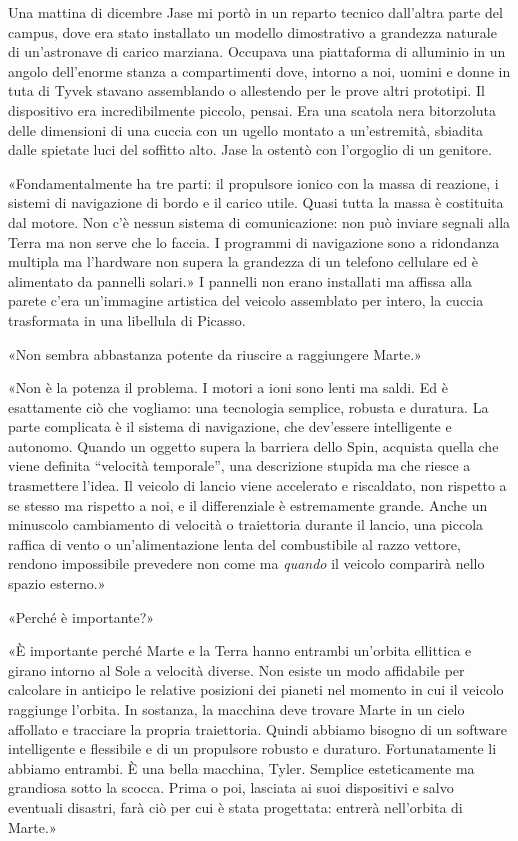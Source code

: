 Una mattina di dicembre Jase mi portò in un reparto tecnico dall'altra
parte del campus, dove era stato installato un modello dimostrativo a
grandezza naturale di un'astronave di carico marziana. Occupava una
piattaforma di alluminio in un angolo dell'enorme stanza a compartimenti
dove, intorno a noi, uomini e donne in tuta di Tyvek stavano assemblando
o allestendo per le prove altri prototipi. Il dispositivo era
incredibilmente piccolo, pensai. Era una scatola nera bitorzoluta delle
dimensioni di una cuccia con un ugello montato a un'estremità, sbiadita
dalle spietate luci del soffitto alto. Jase la ostentò con l'orgoglio di
un genitore.

«Fondamentalmente ha tre parti: il propulsore ionico con la massa di
reazione, i sistemi di navigazione di bordo e il carico utile. Quasi
tutta la massa è costituita dal motore. Non c'è nessun sistema di
comunicazione: non può inviare segnali alla Terra ma non serve che lo
faccia. I programmi di navigazione sono a ridondanza multipla ma
l'hardware non supera la grandezza di un telefono cellulare ed è
alimentato da pannelli solari.» I pannelli non erano installati ma
affissa alla parete c'era un'immagine artistica del veicolo assemblato
per intero, la cuccia trasformata in una libellula di Picasso.

«Non sembra abbastanza potente da riuscire a raggiungere Marte.»

«Non è la potenza il problema. I motori a ioni sono lenti ma saldi. Ed è
esattamente ciò che vogliamo: una tecnologia semplice, robusta e
duratura. La parte complicata è il sistema di navigazione, che
dev'essere intelligente e autonomo. Quando un oggetto supera la barriera
dello Spin, acquista quella che viene definita ``velocità temporale'',
una descrizione stupida ma che riesce a trasmettere l'idea. Il veicolo
di lancio viene accelerato e riscaldato, non rispetto a se stesso ma
rispetto a noi, e il differenziale è estremamente grande. Anche un
minuscolo cambiamento di velocità o traiettoria durante il lancio, una
piccola raffica di vento o un'alimentazione lenta del combustibile al
razzo vettore, rendono impossibile prevedere non come ma \emph{quando}
il veicolo comparirà nello spazio esterno.»

«Perché è importante?»

«È importante perché Marte e la Terra hanno entrambi un'orbita ellittica
e girano intorno al Sole a velocità diverse. Non esiste un modo
affidabile per calcolare in anticipo le relative posizioni dei pianeti
nel momento in cui il veicolo raggiunge l'orbita. In sostanza, la
macchina deve trovare Marte in un cielo affollato e tracciare la propria
traiettoria. Quindi abbiamo bisogno di un software intelligente e
flessibile e di un propulsore robusto e duraturo. Fortunatamente li
abbiamo entrambi. È una bella macchina, Tyler. Semplice esteticamente ma
grandiosa sotto la scocca. Prima o poi, lasciata ai suoi dispositivi e
salvo eventuali disastri, farà ciò per cui è stata progettata: entrerà
nell'orbita di Marte.»

